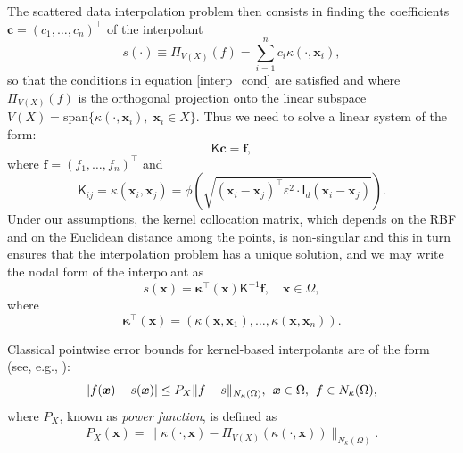 \documentclass[hyphens,a4paper,11pt]{article}
\newcommand{\mK}{\mathsf{K}}
\newcommand{\mI}{\mathsf{I}}
\begin{document}
The scattered data interpolation problem then consists in finding the coefficients $\boldsymbol{c}=(c_1,\ldots,c_n)^{\intercal}$ of the interpolant 
\begin{equation*} 
    s(\cdot) \equiv \Pi_{V(X)}(f) = \sum_{i=1}^n c_i \kappa(\cdot,\boldsymbol{x}_i),
\end{equation*}
so that the conditions in equation \eqref{interp_cond} are satisfied and where $\Pi_{V(X)}(f)$ is the orthogonal projection onto the linear subspace $V(X) = \textrm{span} \{\kappa(\cdot, \boldsymbol{x}_i),\; \boldsymbol{x}_i \in  X \}$. Thus we need to solve a linear system of the form: 
\begin{equation*} 
    \mK  \boldsymbol{c} = \boldsymbol{f}, 
\end{equation*}
where $\boldsymbol{f}=(f_1,\ldots,f_n)^{\intercal}$ and 
\begin{equation*}
    \mK_{ij}=\kappa(\boldsymbol{x}_i,\boldsymbol{x}_j)= \phi \left( \sqrt{(\boldsymbol{x}_i-\boldsymbol{x}_j)^{\intercal} \varepsilon^2 \cdot \mI_d (\boldsymbol{x}_i-\boldsymbol{x}_j )}\right).
\end{equation*}
Under our assumptions, the kernel collocation matrix, which depends on the RBF and on the Euclidean distance  among the points, is non-singular and this in turn ensures that the interpolation problem has a unique solution, and we may write the nodal form of the interpolant as 
\begin{equation*}
     s\left( \boldsymbol{x}\right)=  \boldsymbol{\kappa}^{\intercal}({\boldsymbol{x}} ) \mK^{-1} \boldsymbol{f}, \quad \boldsymbol{x} \in \Omega,
\end{equation*}
where 
\begin{equation*}
    \boldsymbol{\kappa}^{\intercal}({\boldsymbol{x}} ) = \left(\kappa(\boldsymbol{x},\boldsymbol{x}_1), \ldots,\kappa (\boldsymbol{x},\boldsymbol{x}_n) \right).
\end{equation*}
    
Classical pointwise error bounds for kernel-based interpolants are of the form (see, e.g., \cite{wendland2005scattered}):
\begin{equation}\label{eq:bound_pow}
    |f(\boldsymbol{x})-s(\boldsymbol{x})| \leq P_{X} \| f - s \|_{N_{\kappa}(\Omega)}, \hskip 0.15cm \boldsymbol{x} \in \Omega, \hskip 0.15cm f \in N_{\kappa}(\Omega), 
\end{equation}
where $P_{X}$, known as \emph{power function}, is defined as 
\begin{align*}
    P_{X}(\boldsymbol{x}) = \| \kappa(\cdot, \boldsymbol{x})- \Pi_{V(X)}(\kappa(\cdot, \boldsymbol{x})) \|_{N_{\kappa}(\Omega)}.
\end{align*}
\end{document}
